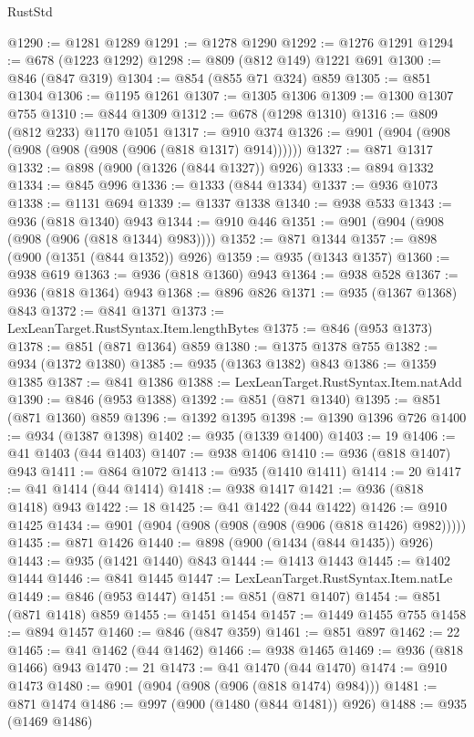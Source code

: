 \begin{lexlean}{RustStd}
\begin{coremodule}
@1290 := @1281 @1289
@1291 := @1278 @1290
@1292 := @1276 @1291
@1294 := @678 (@1223 @1292)
@1298 := @809 (@812 @149) @1221 @691
@1300 := @846 (@847 @319)
@1304 := @854 (@855 @71 @324) @859
@1305 := @851 @1304
@1306 := @1195 @1261
@1307 := @1305 @1306
@1309 := @1300 @1307 @755
@1310 := @844 @1309
@1312 := @678 (@1298 @1310)
@1316 := @809 (@812 @233) @1170 @1051
@1317 := @910 @374
@1326 := @901 (@904 (@908 (@908 (@908 (@908 (@906 (@818 @1317) @914))))))
@1327 := @871 @1317
@1332 := @898 (@900 (@1326 (@844 @1327)) @926)
@1333 := @894 @1332
@1334 := @845 @996
@1336 := @1333 (@844 @1334)
@1337 := @936 @1073
@1338 := @1131 @694
@1339 := @1337 @1338
@1340 := @938 @533
@1343 := @936 (@818 @1340) @943
@1344 := @910 @446
@1351 := @901 (@904 (@908 (@908 (@906 (@818 @1344) @983))))
@1352 := @871 @1344
@1357 := @898 (@900 (@1351 (@844 @1352)) @926)
@1359 := @935 (@1343 @1357)
@1360 := @938 @619
@1363 := @936 (@818 @1360) @943
@1364 := @938 @528
@1367 := @936 (@818 @1364) @943
@1368 := @896 @826
@1371 := @935 (@1367 @1368) @843
@1372 := @841 @1371
@1373 := LexLeanTarget.RustSyntax.Item.lengthBytes
@1375 := @846 (@953 @1373)
@1378 := @851 (@871 @1364) @859
@1380 := @1375 @1378 @755
@1382 := @934 (@1372 @1380)
@1385 := @935 (@1363 @1382) @843
@1386 := @1359 @1385
@1387 := @841 @1386
@1388 := LexLeanTarget.RustSyntax.Item.natAdd
@1390 := @846 (@953 @1388)
@1392 := @851 (@871 @1340)
@1395 := @851 (@871 @1360) @859
@1396 := @1392 @1395
@1398 := @1390 @1396 @726
@1400 := @934 (@1387 @1398)
@1402 := @935 (@1339 @1400)
@1403 := 19
@1406 := @41 @1403 (@44 @1403)
@1407 := @938 @1406
@1410 := @936 (@818 @1407) @943
@1411 := @864 @1072
@1413 := @935 (@1410 @1411)
@1414 := 20
@1417 := @41 @1414 (@44 @1414)
@1418 := @938 @1417
@1421 := @936 (@818 @1418) @943
@1422 := 18
@1425 := @41 @1422 (@44 @1422)
@1426 := @910 @1425
@1434 := @901 (@904 (@908 (@908 (@908 (@906 (@818 @1426) @982)))))
@1435 := @871 @1426
@1440 := @898 (@900 (@1434 (@844 @1435)) @926)
@1443 := @935 (@1421 @1440) @843
@1444 := @1413 @1443
@1445 := @1402 @1444
@1446 := @841 @1445
@1447 := LexLeanTarget.RustSyntax.Item.natLe
@1449 := @846 (@953 @1447)
@1451 := @851 (@871 @1407)
@1454 := @851 (@871 @1418) @859
@1455 := @1451 @1454
@1457 := @1449 @1455 @755
@1458 := @894 @1457
@1460 := @846 (@847 @359)
@1461 := @851 @897
@1462 := 22
@1465 := @41 @1462 (@44 @1462)
@1466 := @938 @1465
@1469 := @936 (@818 @1466) @943
@1470 := 21
@1473 := @41 @1470 (@44 @1470)
@1474 := @910 @1473
@1480 := @901 (@904 (@908 (@906 (@818 @1474) @984)))
@1481 := @871 @1474
@1486 := @997 (@900 (@1480 (@844 @1481)) @926)
@1488 := @935 (@1469 @1486)

\end{coremodule}
\end{lexlean}
